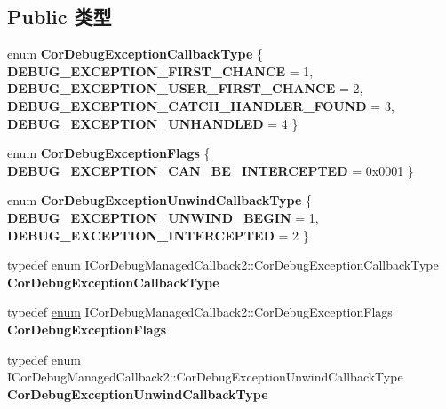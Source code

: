 \subsection*{Public 类型}
\begin{DoxyCompactItemize}
\item 
\mbox{\label{interface_i_cor_debug_managed_callback2_a985ea7b191c22e83e588364ec851cc3a}} 
enum {\bfseries Cor\+Debug\+Exception\+Callback\+Type} \{ {\bfseries D\+E\+B\+U\+G\+\_\+\+E\+X\+C\+E\+P\+T\+I\+O\+N\+\_\+\+F\+I\+R\+S\+T\+\_\+\+C\+H\+A\+N\+CE} = 1, 
{\bfseries D\+E\+B\+U\+G\+\_\+\+E\+X\+C\+E\+P\+T\+I\+O\+N\+\_\+\+U\+S\+E\+R\+\_\+\+F\+I\+R\+S\+T\+\_\+\+C\+H\+A\+N\+CE} = 2, 
{\bfseries D\+E\+B\+U\+G\+\_\+\+E\+X\+C\+E\+P\+T\+I\+O\+N\+\_\+\+C\+A\+T\+C\+H\+\_\+\+H\+A\+N\+D\+L\+E\+R\+\_\+\+F\+O\+U\+ND} = 3, 
{\bfseries D\+E\+B\+U\+G\+\_\+\+E\+X\+C\+E\+P\+T\+I\+O\+N\+\_\+\+U\+N\+H\+A\+N\+D\+L\+ED} = 4
 \}
\item 
\mbox{\label{interface_i_cor_debug_managed_callback2_a9db8f2b21bf5abd560d98c0d84af1ab5}} 
enum {\bfseries Cor\+Debug\+Exception\+Flags} \{ {\bfseries D\+E\+B\+U\+G\+\_\+\+E\+X\+C\+E\+P\+T\+I\+O\+N\+\_\+\+C\+A\+N\+\_\+\+B\+E\+\_\+\+I\+N\+T\+E\+R\+C\+E\+P\+T\+ED} = 0x0001
 \}
\item 
\mbox{\label{interface_i_cor_debug_managed_callback2_a8232eae17811ea71d38a67619e1ebc1d}} 
enum {\bfseries Cor\+Debug\+Exception\+Unwind\+Callback\+Type} \{ {\bfseries D\+E\+B\+U\+G\+\_\+\+E\+X\+C\+E\+P\+T\+I\+O\+N\+\_\+\+U\+N\+W\+I\+N\+D\+\_\+\+B\+E\+G\+IN} = 1, 
{\bfseries D\+E\+B\+U\+G\+\_\+\+E\+X\+C\+E\+P\+T\+I\+O\+N\+\_\+\+I\+N\+T\+E\+R\+C\+E\+P\+T\+ED} = 2
 \}
\item 
\mbox{\label{interface_i_cor_debug_managed_callback2_aa353e75d1a7913d37601a1b8b5c57bbd}} 
typedef \hyperlink{interfaceenum}{enum} I\+Cor\+Debug\+Managed\+Callback2\+::\+Cor\+Debug\+Exception\+Callback\+Type {\bfseries Cor\+Debug\+Exception\+Callback\+Type}
\item 
\mbox{\label{interface_i_cor_debug_managed_callback2_aa45910b8bd896ff04f44d6a51321d7e0}} 
typedef \hyperlink{interfaceenum}{enum} I\+Cor\+Debug\+Managed\+Callback2\+::\+Cor\+Debug\+Exception\+Flags {\bfseries Cor\+Debug\+Exception\+Flags}
\item 
\mbox{\label{interface_i_cor_debug_managed_callback2_a48354066754c7d3a82de4001e4ef1333}} 
typedef \hyperlink{interfaceenum}{enum} I\+Cor\+Debug\+Managed\+Callback2\+::\+Cor\+Debug\+Exception\+Unwind\+Callback\+Type {\bfseries Cor\+Debug\+Exception\+Unwind\+Callback\+Type}
\end{DoxyCompactItemize}
